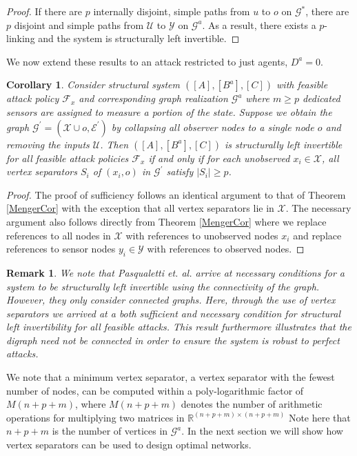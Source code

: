 \documentclass[letterpaper, 10 pt, conference]{ieeeconf}
\newtheorem{corollary}[theorem]{Corollary}
\newtheorem{remark}[theorem]{Remark}
\begin{document}
\begin{proof}
If there are $p$ internally disjoint, simple paths from $u$ to $o$ on $\mathcal{G}^*$, there are $p$ disjoint and simple paths from $\mathcal{U}$ to $\mathcal{Y}$ on $\mathcal{G}^a$. As a result, there exists a $p$-linking and the system is structurally left invertible.
\end{proof}
We now extend these results to an attack restricted to just agents, $D^a = 0$.
\begin{corollary}
Consider structural system  $([A],[B^a],[C])$ with feasible attack policy $\mathcal{F}_{x}$ and corresponding graph realization $\mathcal{G}^a$ where $m \ge p$ dedicated sensors are assigned to measure a portion of the state. Suppose we obtain the graph $\mathcal{G}^\prime = (\mathcal{X} \cup o, \mathcal{E}^\prime)$ by collapsing all observer nodes to a single node $o$ and removing the inputs $\mathcal{U}$. Then $([A],[B^a],[C])$ is structurally left invertible for all feasible attack policies $\mathcal{F}_{x}$ if and only if for each unobserved $x_i \in \mathcal{X}$, all vertex separators $S_i$ of $(x_i,o)$ in $\mathcal{G}^\prime$ satisfy $|S_i| \ge p$. \label{VS ABC} 
\end{corollary}
\begin{proof}
    The proof of sufficiency follows an identical argument to that of Theorem \ref{MengerCor} with the exception that all vertex separators lie in $\mathcal{X}$. The necessary argument also follows directly from Theorem \ref{MengerCor} where we replace references to all nodes in $\mathcal{X}$ with references to unobserved nodes $x_i$ and replace references to sensor nodes $y_i \in \mathcal{Y}$ with references to observed nodes.
\end{proof}
\begin{remark}
We note that Pasqualetti et. al. \cite{PasqualettiConsensusUnreliable} arrive at necessary conditions for a system to be structurally left invertible using the connectivity of the graph. However, they only consider connected graphs. Here, through the use of vertex separators we arrived at a both sufficient and necessary condition for structural left invertibility for all feasible attacks. This result furthermore illustrates that the digraph need not be connected in order to ensure the system is robust to perfect attacks.
\end{remark}

We note that a minimum vertex separator, a vertex separator with the fewest number of nodes, can be computed  within a poly-logarithmic factor of $M(n+p+m)$, where $M(n+p+m)$ denotes the number of arithmetic operations for multiplying two matrices in $\mathbb{R}^{(n+p+m) \times (n+p+m)}$ \cite{Cheriyan1997} Note here that $n+p+m$ is the number of vertices in $\mathcal{G}^a$. In the next section we will show how vertex separators can be used to design optimal networks.
\end{document}
